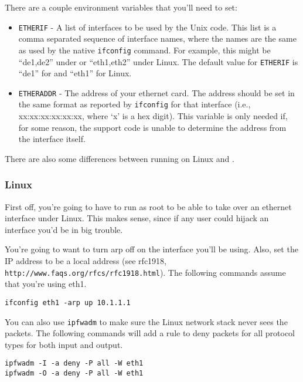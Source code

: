 There are a couple environment variables that you'll need to set:

\begin{itemize}

\item {\tt ETHERIF} - A list of interfaces to be used by the \oskit{} Unix code.
This list is a comma separated sequence of interface names, where the names are
the same as used by the native {\tt ifconfig} command.  For example, this
might be ``de1,de2'' under \freebsd{} or ``eth1,eth2'' under Linux.
The default value for {\tt ETHERIF} is ``de1'' for \freebsd{} and 
``eth1'' for Linux.

\item {\tt ETHERADDR} - The address of your ethernet card.  The
address should be set in the same format as reported by {\tt ifconfig} for
that interface (i.e., xx:xx:xx:xx:xx:xx, where `x' is a hex digit).  This
variable is only needed if, for some reason, the support code is unable
to determine the address from the interface itself.

\end{itemize}

There are also some differences between running on Linux and \freebsd{}.

\subsubsection{Linux}

First off, you're going to have to run as root to be able to take over
an ethernet interface under Linux.  This makes sense, since if any
user could hijack an interface you'd be in big trouble.

You're going to want to turn arp off on the interface you'll be using.
Also, set the IP address to be a local address (see rfc1918,
{\tt http://www.faqs.org/rfcs/rfc1918.html}).  The following commands
assume that you're using eth1.

\begin{verbatim}
ifconfig eth1 -arp up 10.1.1.1
\end{verbatim}

You can also use {\tt ipfwadm} to make sure the Linux network stack
never sees the packets.  The following commands will add a rule to
deny packets for all protocol types for both input and output.

\begin{verbatim}
ipfwadm -I -a deny -P all -W eth1
ipfwadm -O -a deny -P all -W eth1
\end{verbatim}

